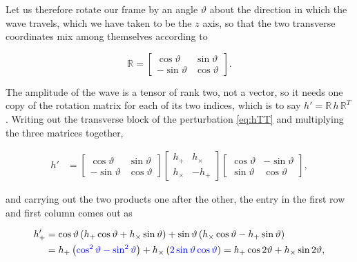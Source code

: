             Let us therefore rotate our frame by an angle $\vartheta$ about the direction in which the wave travels, which we have taken to be the $z$ axis, so that the two transverse coordinates mix among themselves according to

            \begin{equation}\label{eq:RotationMatrix}
                \mathbb{R} =
                \begin{bmatrix}
                    \cos\vartheta & \sin\vartheta\\
                    -\sin\vartheta & \cos\vartheta
                \end{bmatrix}.
            \end{equation}

            The amplitude of the wave is a tensor of rank two, not a vector, so it needs one copy of the rotation matrix for each of its two indices, which is to say $h' = \mathbb{R}\,h\,\mathbb{R}^{T}$. Writing out the transverse block of the perturbation \ref{eq:hTT} and multiplying the three matrices together,

            \begin{align*}
                h' &=
                \begin{bmatrix}
                    \cos\vartheta & \sin\vartheta\\
                    -\sin\vartheta & \cos\vartheta
                \end{bmatrix}
                \begin{bmatrix}
                    h_+ & h_{\times}\\
                    h_{\times} & -h_+
                \end{bmatrix}
                \begin{bmatrix}
                    \cos\vartheta & -\sin\vartheta\\
                    \sin\vartheta & \cos\vartheta
                \end{bmatrix},
            \end{align*}

            and carrying out the two products one after the other, the entry in the first row and first column comes out as

            \begin{align*}
                h'_{+} &= \cos\vartheta\left(h_+\cos\vartheta + h_{\times}\sin\vartheta\right) + \sin\vartheta\left(h_{\times}\cos\vartheta - h_+\sin\vartheta\right)\\
                &= h_+\left({\color{blue}\cos^2\vartheta - \sin^2\vartheta}\right) + h_{\times}\left({\color{blue}2\sin\vartheta\cos\vartheta}\right) = h_+\cos2\vartheta + h_{\times}\sin2\vartheta,
            \end{align*}

